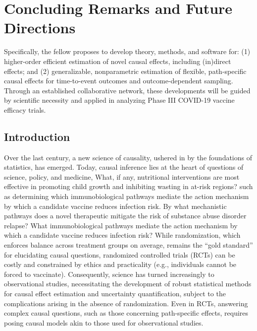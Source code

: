 \chapter{Concluding Remarks and Future Directions}

Specifically, the fellow proposes to develop theory, methods, and software for:
(1) higher-order efficient estimation of novel causal effects, including
(in)direct effects; and (2) generalizable, nonparametric estimation of flexible,
path-specific causal effects for time-to-event outcomes and outcome-dependent
sampling. Through an established collaborative network, these developments will
be guided by scientific necessity and applied in analyzing Phase III COVID-19
vaccine efficacy trials.

\section{Introduction}

Over the last century, a new science of causality, ushered in by the foundations
of statistics, has emerged. Today, causal inference lies at the heart of
questions of science, policy, and medicine,
What, if any, nutritional interventions are most effective in promoting child
growth and inhibiting wasting in at-risk regions?
such as determining which immunobiological pathways mediate the action mechanism
by which a candidate vaccine reduces infection risk.
By what mechanistic pathways does a novel therapeutic mitigate the risk of
substance abuse disorder relapse? What immunobiological pathways mediate the
action mechanism by which a candidate vaccine reduces infection risk?
While randomization, which enforces balance across treatment groups on average,
remains the ``gold standard'' for elucidating causal questions, randomized
controlled trials (RCTs) can be costly and constrained by ethics and
practicality (e.g., individuals cannot be forced to vaccinate). Consequently,
science has turned increasingly to observational studies, necessitating the
development of robust statistical methods for causal effect estimation and
uncertainty quantification, subject to the complications arising in the absence
of randomization. Even in RCTs, answering complex causal questions, such as
those concerning path-specific effects, requires posing causal models akin to
those used for observational studies.

